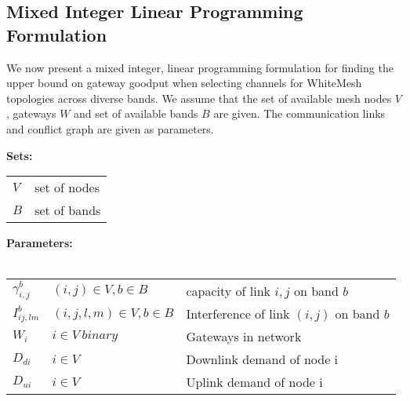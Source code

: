 \subsection{Mixed Integer Linear Programming Formulation}
\label{subsec:linearopt}

We now present a mixed integer, linear programming formulation for 
finding the upper bound on gateway goodput when selecting channels
for WhiteMesh topologies across diverse bands. We assume that the
set of available mesh nodes $V$ , gateways $W$ and set of available bands $B$ are given. 
The communication links and conflict graph are given as parameters.

\noindent
{\bf Sets:}
\begin{tabular}{ll}
$V$ & set of nodes \\
$B$ & set of bands \\
\end{tabular}

\noindent
{\bf Parameters:}\\
\\
\begin{tabular}{llp{2.8cm}}
$\gamma_{i,j}^b$ & $(i,j)\in V, b \in B$ & capacity of link $i,j$ on band $b$\\
$I_{ij,lm}^b$ & $(i,j,l,m) \in V, b\in B $ & Interference of link $(i,j)$ on band $b$\\
$W_i$ & $i \in V\ binary$ & Gateways in network\\
$D_{di}$ & $i \in V\ $ & Downlink demand of node i\\
$D_{ui}$ & $i \in V\ $ & Uplink demand of node i\\
\end{tabular}\\


